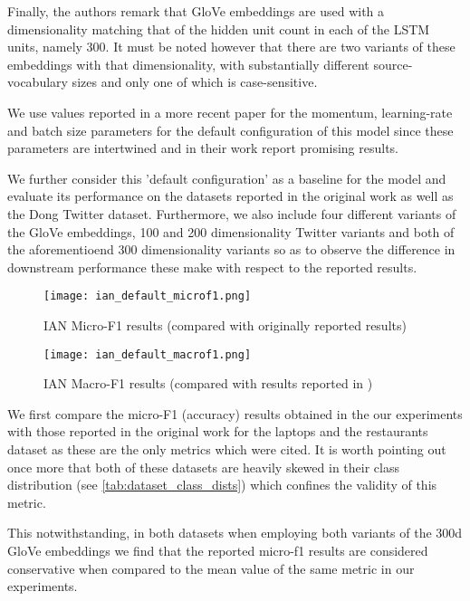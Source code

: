 \documentclass[../../fyp.tex]{subfiles}
\begin{document}
Finally, the authors remark that GloVe \citep{pennington} embeddings are used with a dimensionality matching that of the hidden unit count in each of the LSTM units, namely 300. It must be noted however that there are two variants of these embeddings with that dimensionality, with substantially different source-vocabulary sizes and only one of which is case-sensitive.

We use values reported in a more recent paper \citep{zhang2018} for the momentum, learning-rate and batch size parameters for the default configuration of this model since these parameters are intertwined and in their work report promising results. 

We further consider this 'default configuration' as a baseline for the model and evaluate its performance on the datasets reported in the original work as well as the Dong Twitter dataset. Furthermore, we also include four different variants of the GloVe embeddings, 100 and 200 dimensionality Twitter variants and both of the aforementioend 300 dimensionality variants so as to observe the difference in downstream performance these make with respect to the reported results. 

\begin{figure}[!ht]
	\centering
	\texttt{[image: ian\_default\_microf1.png]}
	\caption{IAN Micro-F1 results (compared with originally reported results)}
	\label{fig:ian_default_microf1}
\end{figure}

\begin{figure}[!ht]
	\centering
	\texttt{[image: ian\_default\_macrof1.png]}
	\caption{IAN Macro-F1 results (compared with results reported in \citet{navonil2020})}
	\label{fig:ian_default_macrof1}
\end{figure}

We first compare the micro-F1 (accuracy) results obtained in the our experiments with those reported in the original work \citep{dehongma2017} for the laptops and the restaurants dataset as these are the only metrics which were cited. It is worth pointing out once more that both of these datasets are heavily skewed in their class distribution (see \ref{tab:dataset_class_dists}) which confines the validity of this metric.

This notwithstanding, in both datasets when employing both variants of the 300d GloVe embeddings we find that the reported micro-f1 results are considered conservative when compared to the mean value of the same metric in our experiments. 
\end{document}
